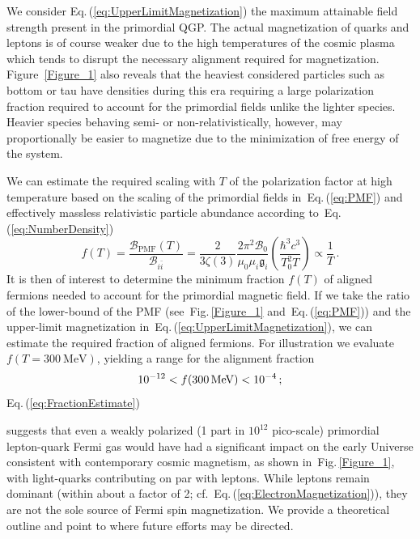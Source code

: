 \documentclass[epjST]{svjour}
\newcommand*{\MeV}{\text{\,MeV}}
\newcommand{\req}[1]{Eq.\,(\ref{#1})}
\newcommand{\rf}[1]{Fig.\,{\ref{#1}}}
\begin{document}
{\color{blue}We consider \req{eq:UpperLimitMagnetization} the maximum attainable field strength present in the primordial QGP. The actual magnetization of quarks and leptons is of course weaker due to the high temperatures of the cosmic plasma which tends to disrupt the necessary alignment required for magnetization. Figure~\ref{Figure_1} also reveals that the heaviest considered particles such as bottom or tau have densities during this era requiring a large polarization fraction required to account for the primordial fields unlike the lighter species. Heavier species behaving semi- or non-relativistically, however, may proportionally be easier to magnetize due to the minimization of free energy of the system.

We can estimate the required scaling with $T$ of the polarization factor at high temperature based on the scaling of the primordial fields in~\req{eq:PMF} and effectively massless relativistic particle abundance according to~\req{eq:NumberDensity}
\begin{equation}
\label{eq:FractionAligned}
f(T) = \frac{\mathcal{B}_\mathrm{PMF}(T)}{\mathcal{B}_{i\bar{i}}} 
= \frac{2}{3\zeta(3)}\frac{2\pi^{2}\mathcal{B}_{0}}{\mu_{0}\mu_{i}\mathfrak{g}_{i}}\left(\frac{\hbar^{3}c^{3}}{T_{0}^{2}T}\right)\propto\frac{1}{T}\,.
\end{equation}
It is then of interest to determine the minimum fraction \(f(T)\) of aligned fermions needed to account for the primordial magnetic field. If we take the ratio of the lower-bound of the PMF (see~\rf{Figure_1} and~\req{eq:PMF}) and the upper-limit magnetization in~\req{eq:UpperLimitMagnetization}, we can estimate the required fraction of aligned fermions. For illustration we evaluate \(f(T=300~\mathrm{MeV})\), yielding a range for the alignment fraction
\begin{equation}
\label{eq:FractionEstimate}
10^{-12} < f(300\MeV) < 10^{-4}\,;
\end{equation}
\req{eq:FractionEstimate}} suggests that even a weakly polarized ({\color{blue}1 part in $10^{12}$} pico-scale) primordial lepton-quark Fermi gas would have had a significant impact on the early Universe consistent with contemporary cosmic magnetism, as shown in~\rf{Figure_1}, with light-quarks contributing on par with leptons. While leptons remain dominant (within about a factor of 2; cf.~\req{eq:ElectronMagnetization}), they are not the sole source of Fermi spin magnetization. We provide a theoretical outline and point to where future efforts may be directed.
\end{document}
